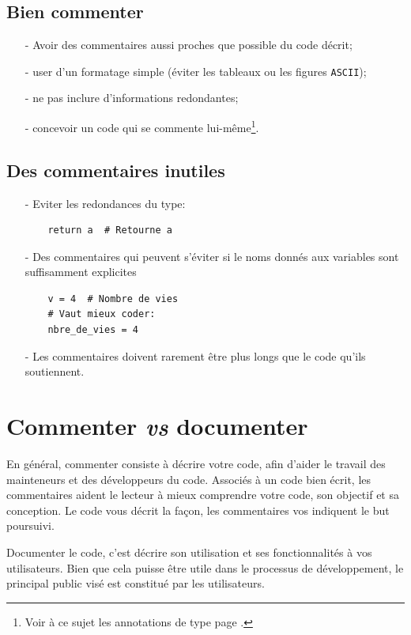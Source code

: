 \documentclass[a4paper,12pt]{book}
\begin{document}
\subsection*{Bien commenter}
\begin{itemize}
	\item[-] Avoir des commentaires aussi proches que possible du code décrit;
	\item[-] user d'un formatage simple (éviter les tableaux ou les figures \texttt{ASCII});
	\item[-] ne pas inclure d'informations redondantes;
	\item[-] concevoir un code qui se commente lui-même\footnote{Voir à ce sujet les annotations de type page \pageref{annotation_types}.}.
\end{itemize}
\medskip

\subsection*{Des commentaires inutiles}
\begin{itemize}
	\item[-] Eviter les redondances du type:
	\begin{lstlisting}
	return a  # Retourne a
	\end{lstlisting}
	\item[-] Des commentaires qui peuvent s'éviter si le noms donnés aux variables sont suffisamment explicites
	\begin{lstlisting}
	v = 4  # Nombre de vies
	# Vaut mieux coder:
	nbre_de_vies = 4
	\end{lstlisting}
	\item[-] Les commentaires doivent rarement être plus longs que le code qu'ils soutiennent.
\end{itemize}
\medskip

\section{Commenter \textit{vs} documenter}
En général, commenter consiste à décrire votre code, afin d'aider le travail des mainteneurs et des développeurs du code. Associés à un code bien écrit, les commentaires aident le lecteur à mieux comprendre votre code, son objectif et sa conception. Le code vous décrit la façon, les commentaires vos indiquent le but poursuivi.
\medskip

Documenter le code, c'est décrire son utilisation et ses fonctionnalités à vos utilisateurs. Bien que cela puisse être utile dans le processus de développement, le principal public visé est constitué par les utilisateurs.
\medskip
\end{document}
